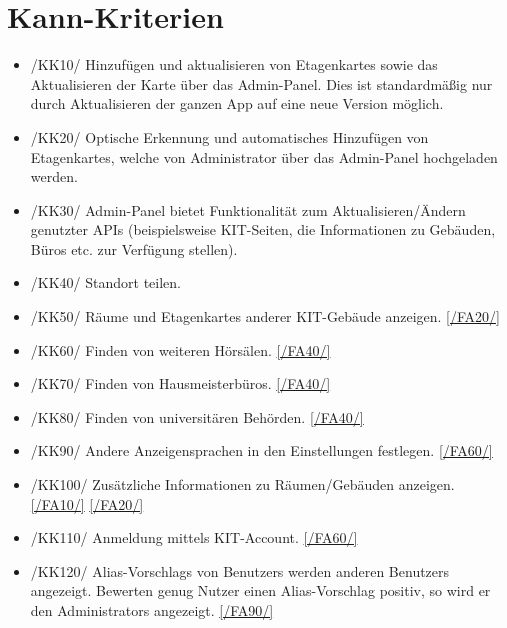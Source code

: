 \section{Kann-Kriterien}

\begin{itemize}

    \item{/KK10/} \label{/KK10/} Hinzufügen und aktualisieren von \Glspl{Etagenkarte} sowie das Aktualisieren der \Gls{Karte} über das \Gls{Admin-Panel}.
        Dies ist standardmäßig nur durch Aktualisieren der ganzen App auf eine neue Version möglich.
    \item{/KK20/} \label{/KK20/} Optische Erkennung und automatisches Hinzufügen von \Glspl{Etagenkarte},
          welche von \Gls{Administrator} über das \Gls{Admin-Panel} hochgeladen werden.
          
    \item{/KK30/} \label{/KK30/} \Gls{Admin-Panel} bietet Funktionalität zum Aktualisieren/Ändern genutzter \Gls{API}s (beispielsweise \Gls{KIT}-Seiten, die Informationen zu Gebäuden, Büros etc. zur Verfügung stellen).
    \item{/KK40/} \label{/KK40/} Standort teilen.
    \item{/KK50/} \label{/KK50/} Räume und \Glspl{Etagenkarte} anderer \Gls{KIT}-Gebäude anzeigen. \ref{/FA20/}
    \item{/KK60/} \label{/KK60/} Finden von weiteren Hörsälen. \ref{/FA40/}
    \item{/KK70/} \label{/KK70/} Finden von Hausmeisterbüros. \ref{/FA40/}
    \item{/KK80/} \label{/KK80/} Finden von universitären Behörden. \ref{/FA40/}
    \item{/KK90/} \label{/KK90/} Andere Anzeigensprachen in den Einstellungen festlegen. \ref{/FA60/}
    \item{/KK100/} \label{/KK100/} Zusätzliche Informationen zu Räumen/Gebäuden anzeigen. \ref{/FA10/} \ref{/FA20/}
    \item{/KK110/} \label{/KK110/} Anmeldung mittels \Gls{KIT}-Account. \ref{/FA60/}
    \item{/KK120/} \label{/KK120/} \Glspl{Alias-Vorschlag} von \Glspl{Benutzer} werden anderen \Glspl{Benutzer} angezeigt. Bewerten genug Nutzer einen 
    \Gls{Alias-Vorschlag} positiv, so wird er den \Glspl{Administrator} angezeigt. \ref{/FA90/}
    
        

\end{itemize}
